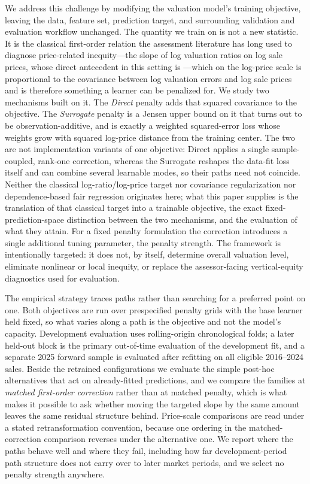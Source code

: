 \documentclass[10pt]{article}
\theoremstyle{definition}
\newcommand{\1}{\mathbf{1}}
\begin{document}
{We address this challenge by modifying the valuation model's training objective, leaving the data, feature set, prediction target, and surrounding validation and evaluation workflow unchanged. The quantity we train on is not a new statistic. It is the classical first-order relation the assessment literature has long used to diagnose price-related inequity---the slope of log valuation ratios on log sale prices, whose direct antecedent in this setting is \textcite{Cheng1974}---which on the log-price scale is proportional to the covariance between log valuation errors and log sale prices and is therefore something a learner can be penalized for. We study two mechanisms built on it. The \emph{Direct} penalty adds that squared covariance to the objective. The \emph{Surrogate} penalty is a Jensen upper bound on it that turns out to be observation-additive, and is exactly a weighted squared-error loss whose weights grow with squared log-price distance from the training center. The two are not implementation variants of one objective: Direct applies a single sample-coupled, rank-one correction, whereas the Surrogate reshapes the data-fit loss itself and can combine several learnable modes, so their paths need not coincide. Neither the classical log-ratio/log-price target nor covariance regularization nor dependence-based fair regression originates here; what this paper supplies is the translation of that classical target into a trainable objective, the exact fixed-prediction-space distinction between the two mechanisms, and the evaluation of what they attain. For a fixed penalty formulation the correction introduces a single additional tuning parameter, the penalty strength.
The framework is intentionally targeted: it does not, by itself, determine overall valuation level, eliminate nonlinear or local inequity, or replace the assessor-facing vertical-equity diagnostics used for evaluation.}


{The empirical strategy traces paths rather than searching for a preferred point on one. Both objectives are run over prespecified penalty grids with the base learner held fixed, so what varies along a path is the objective and not the model's capacity. Development evaluation uses rolling-origin chronological folds; a later held-out block is the primary out-of-time evaluation of the development fit, and a separate 2025 forward sample is evaluated after refitting on all eligible 2016--2024 sales. Beside the retrained configurations we evaluate the simple post-hoc alternatives that act on already-fitted predictions, and we compare the families at \emph{matched first-order correction} rather than at matched penalty, which is what makes it possible to ask whether moving the targeted slope by the same amount leaves the same residual structure behind. Price-scale comparisons are read under a stated retransformation convention, because one ordering in the matched-correction comparison reverses under the alternative one. We report where the paths behave well and where they fail, including how far development-period path structure does not carry over to later market periods, and we select no penalty strength anywhere.}
\end{document}
